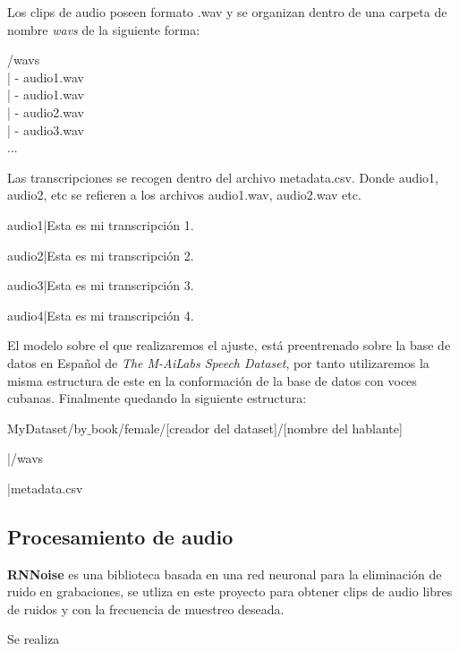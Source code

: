 Los clips de audio poseen formato .wav y se organizan dentro de una carpeta de nombre \textit{wavs} de la siguiente forma:

\begin{center}
	/wavs\\
	| - audio1.wav\\
	| - audio1.wav\\
	| - audio2.wav\\
	| - audio3.wav\\
	...
\end{center}

Las transcripciones se recogen dentro del archivo metadata.csv. Donde audio1, audio2, etc se refieren a los archivos audio1.wav, audio2.wav etc.

\begin{center}
	audio1|Esta es mi transcripción 1.
	
	audio2|Esta es mi transcripción 2.
	
	audio3|Esta es mi transcripción 3.
	
	audio4|Esta es mi transcripción 4.
\end{center}

El modelo sobre el que realizaremos el ajuste, está preentrenado sobre la base de datos en Español de \textit{The M-AiLabs Speech Dataset}, por tanto utilizaremos la misma estructura de este en la conformación de la base de datos con voces cubanas. Finalmente quedando la siguiente estructura:

\begin{flushleft}
	MyDataset/by$\_$book/female/[creador del dataset]/[nombre del hablante]
	
	|/wavs
	
	|metadata.csv
\end{flushleft}






\subsection{Procesamiento de audio}

\textbf{RNNoise} es una biblioteca basada en una red neuronal para la eliminación de ruido en grabaciones, se utliza en este proyecto para obtener clips de audio libres de ruidos y con la frecuencia de muestreo deseada.

Se realiza 










 